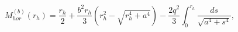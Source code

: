\begin{equation}
M^{(b)}_{hor}(r_h)= \frac{r_h}{2}+\frac{b^2
r_{h}}{3}(r_{h}^2-\sqrt{r_{h}^4+a^4})-\frac{2q^2}{3}
\int^{r_h}_{0}{\frac{ds}{\sqrt{a^4+s^4}}}, 
\label{Mhor}
\end{equation}


